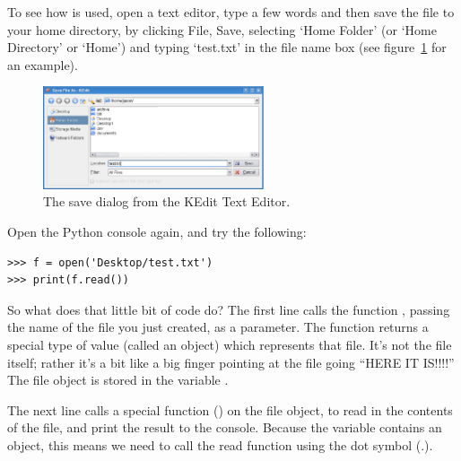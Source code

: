 \begin{LINUX}
To see how  is used, open a text editor, type a few words and then save the file to your home directory, by clicking File, Save, selecting `Home Folder' (or `Home Directory' or `Home') and typing `test.txt' in the file name box (see figure~\ref{fig19} for an example).

\begin{figure}
\begin{center}
\includegraphics[width=65mm]{eps/figure19.eps}
\end{center}
\caption{The save dialog from the KEdit Text Editor.}\label{fig19}
\end{figure}

Open the Python console again, and try the following:

\begin{listing}
\begin{verbatim}
>>> f = open('Desktop/test.txt')
>>> print(f.read())
\end{verbatim}
\end{listing}

\end{LINUX}

So what does that little bit of code do?  The first line calls the function , passing the name of the file you just created, as a parameter.  The function returns a special type of value (called an object) which represents that file.  It's not the file itself; rather it's a bit like a big finger pointing at the file going ``HERE IT IS!!!!''  The file object is stored in the variable .
\par
The next line calls a special function () on the file object, to read in the contents of the file, and print the result to the console.  Because the variable  contains an object, this means we need to call the read function using the dot symbol (.).


